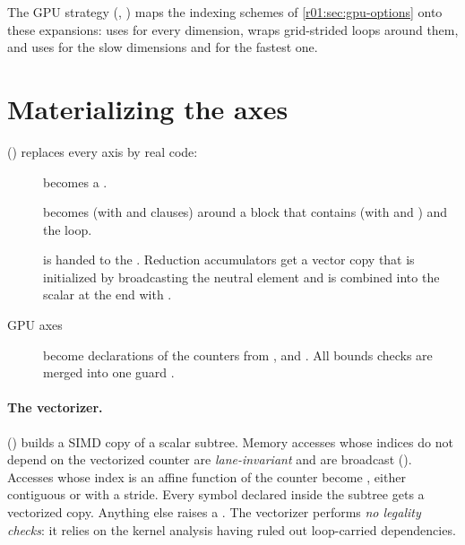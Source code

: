 The GPU strategy (, ) maps
the indexing schemes of \cref{r01:sec:gpu-options} onto these expansions:
 uses  for every dimension,
 wraps grid-strided loops around them, and
 uses  for the slow dimensions and
 for the fastest one.

\section{Materializing the axes}

 () replaces every axis by real code:
\begin{description}
  \item[] becomes a .
  \item[] becomes
     (with  and  clauses)
    around a block that contains  (with  and
    ) and the loop.
  \item[] is handed to the . Reduction accumulators
    get a vector copy that is initialized by broadcasting the neutral element and is
    combined into the scalar at the end with .
  \item[GPU axes] become declarations of the counters from ,
     and . All bounds checks are merged into one guard
    .
\end{description}

\paragraph{The vectorizer.}
 () builds a SIMD copy of a scalar subtree.
Memory accesses whose indices do not depend on the vectorized counter are
\emph{lane-invariant} and are broadcast (). Accesses whose index is
an affine function of the counter become , either contiguous or with a
stride. Every symbol declared inside the subtree gets a vectorized copy. Anything else
raises a . The vectorizer performs \emph{no legality checks}:
it relies on the kernel analysis having ruled out loop-carried dependencies.

